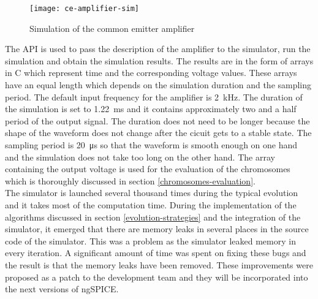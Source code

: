 \begin{figure}[H]
    \centering
    \texttt{[image: ce-amplifier-sim]}\label{ce-amplifier-sim}
    \caption{Simulation of the common emitter amplifier}
\end{figure}

The API is used to pass the description of the amplifier to the simulator, run the simulation and obtain the simulation results. The results are in the form of arrays in C which represent time and the corresponding voltage values. These arrays have an equal length which depends on the simulation duration and the sampling period. The default input frequency for the amplifier is \SI{2}{\kilo\hertz}. The duration of the simulation is set to \SI{1.22}{\milli\second} and it contains approximately two and a half period of the output signal. The duration does not need to be longer because the shape of the waveform does not change after the cicuit gets to a stable state. The sampling period is \SI{20}{\micro\second} so that the waveform is smooth enough on one hand and the simulation does not take too long on the other hand. The array containing the output voltage is used for the evaluation of the chromosomes which is thoroughly discussed in section \ref{chromosomes-evaluation}.\\
The simulator is launched several thousand times during the typical evolution and it takes most of the computation time. During the implementation of the algorithms discussed in section \ref{evolution-strategies} and the integration of the simulator, it emerged that there are memory leaks in several places in the source code of the simulator. This was a problem as the simulator leaked memory in every iteration. A significant amount of time was spent on fixing these bugs and the result is that the memory leaks have been removed. These improvements were proposed as a patch to the development team and they will be incorporated into the next versions of ngSPICE.